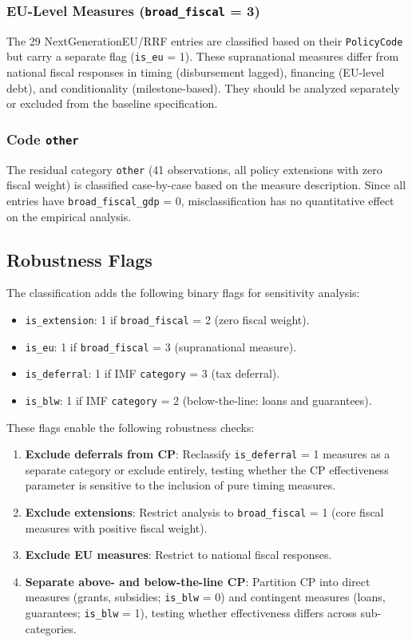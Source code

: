 \documentclass[12pt]{article}
\begin{document}
\subsubsection{EU-Level Measures (\texttt{broad\_fiscal} = 3)}

The 29 NextGenerationEU/RRF entries are classified based on their \texttt{PolicyCode} but carry a separate flag (\texttt{is\_eu} = 1). These supranational measures differ from national fiscal responses in timing (disbursement lagged), financing (EU-level debt), and conditionality (milestone-based). They should be analyzed separately or excluded from the baseline specification.

\subsubsection{Code \texttt{other}}

The residual category \texttt{other} (41 observations, all policy extensions with zero fiscal weight) is classified case-by-case based on the measure description. Since all entries have \texttt{broad\_fiscal\_gdp} = 0, misclassification has no quantitative effect on the empirical analysis.

\subsection{Robustness Flags}

The classification adds the following binary flags for sensitivity analysis:

\begin{itemize}
  \item \texttt{is\_extension}: 1 if \texttt{broad\_fiscal} = 2 (zero fiscal weight).
  \item \texttt{is\_eu}: 1 if \texttt{broad\_fiscal} = 3 (supranational measure).
  \item \texttt{is\_deferral}: 1 if IMF \texttt{category} = 3 (tax deferral).
  \item \texttt{is\_blw}: 1 if IMF \texttt{category} = 2 (below-the-line: loans and guarantees).
\end{itemize}

\noindent These flags enable the following robustness checks:

\begin{enumerate}
  \item \textbf{Exclude deferrals from CP}: Reclassify \texttt{is\_deferral} = 1 measures as a separate category or exclude entirely, testing whether the CP effectiveness parameter is sensitive to the inclusion of pure timing measures.
  \item \textbf{Exclude extensions}: Restrict analysis to \texttt{broad\_fiscal} = 1 (core fiscal measures with positive fiscal weight).
  \item \textbf{Exclude EU measures}: Restrict to national fiscal responses.
  \item \textbf{Separate above- and below-the-line CP}: Partition CP into direct measures (grants, subsidies; \texttt{is\_blw} = 0) and contingent measures (loans, guarantees; \texttt{is\_blw} = 1), testing whether effectiveness differs across sub-categories.
\end{enumerate}
\end{document}
